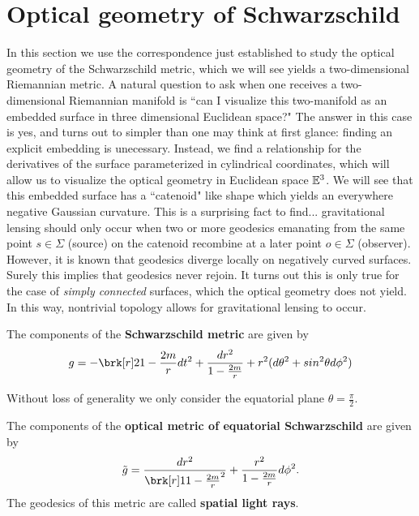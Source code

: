 \section{Optical geometry of Schwarzschild}
In this section we use the correspondence just established to study the optical geometry of the Schwarzschild metric, which we will see yields a two-dimensional Riemannian metric. A natural question to ask when one receives a two-dimensional Riemannian manifold is ``can I visualize this two-manifold as an embedded surface in three dimensional Euclidean space?" The answer in this case is yes, and turns out to simpler than one may think at first glance: finding an explicit embedding is unecessary. Instead, we find a relationship for the derivatives of the surface parameterized in cylindrical coordinates, which will allow us to visualize the optical geometry in Euclidean space $\mathbb{E}^3$. We will see that this embedded surface has a ``catenoid" like shape which yields an everywhere negative Gaussian curvature. This is a surprising fact to find... gravitational lensing should only occur when two or more geodesics emanating from the same point $s \in \Sigma$ (source) on the catenoid recombine at a later point $o \in \Sigma$ (observer). However, it is known that geodesics diverge locally on negatively curved surfaces. Surely this implies that geodesics never rejoin. It turns out this is only true for the case of \textit{simply connected} surfaces, which the optical geometry does not yield. In this way, nontrivial topology allows for gravitational lensing to occur.

\begin{definition}[]\label{}
The components of the \textbf{Schwarzschild metric} are given by
\begin{equation}\label{}
g = -\brk[r]2{1-\frac{2m}{r}} dt^2 + \frac{dr^2}{1-\frac{2m}{r}} + r^2(d\theta^2 + sin^2\theta d\phi^2)
\end{equation}

\end{definition}

Without loss of generality we only consider the equatorial plane $\theta=\frac{\pi}{2}$.
\begin{definition}[]\label{}
The components of the \textbf{optical metric of equatorial Schwarzschild} are given by
\begin{equation}\label{}
\fermat = \frac{dr^2}{\brk[r]1{1 - \frac{2m}{r}}^2} + \frac{r^2}{1 - \frac{2m}{r}} d\phi^2.
\end{equation}
The geodesics of this metric are called \textbf{spatial light rays}.
\end{definition}


